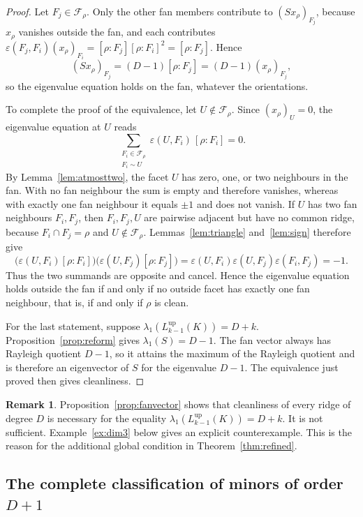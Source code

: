 \documentclass[11pt,reqno]{amsart}
\numberwithin{equation}{section}
\theoremstyle{plain}
\theoremstyle{definition}
\newtheorem{remark}[theorem]{Remark}
\newcommand{\Lup}{L^{\mathrm{up}}}
\newcommand{\eps}{\varepsilon}
\newcommand{\Fset}{\mathcal F}
\begin{document}
\begin{proof}
Let $F_j\in\Fset_\rho$. Only the other fan members contribute to ${(Sx_\rho)}_{F_j}$, because
$x_\rho$ vanishes outside the fan, and each contributes
$\eps(F_j,F_i){(x_\rho)}_{F_i}=[\rho:F_j]{[\rho:F_i]}^{2}=[\rho:F_j]$. Hence
\[
  {(Sx_\rho)}_{F_j}=(D-1)[\rho:F_j]=(D-1){(x_\rho)}_{F_j},
\]
so the eigenvalue equation holds on the fan, whatever the orientations.

To complete the proof of the equivalence, let $U\notin\Fset_\rho$. Since ${(x_\rho)}_U=0$,
the eigenvalue equation at $U$ reads
\[
  \sum_{\substack{F_i\in\Fset_\rho\\ F_i\sim U}}\eps(U,F_i)\,[\rho:F_i]=0 .
\]
By Lemma~\ref{lem:atmosttwo}, the facet $U$ has zero, one, or two neighbours in the fan. With
no fan neighbour the sum is empty and therefore vanishes, whereas with exactly one fan neighbour
it equals $\pm1$ and does not vanish. If $U$ has two fan neighbours $F_i,F_j$, then
$F_i,F_j,U$ are pairwise adjacent but have no common ridge, because $F_i\cap F_j=\rho$ and
$U\notin\Fset_\rho$. Lemmas~\ref{lem:triangle} and~\ref{lem:sign} therefore give
\[
  \bigl(\eps(U,F_i)[\rho:F_i]\bigr)
  \bigl(\eps(U,F_j)[\rho:F_j]\bigr)
  =\eps(U,F_i)\eps(U,F_j)\eps(F_i,F_j)=-1 .
\]
Thus the two summands are opposite and cancel. Hence the eigenvalue equation holds outside the
fan if and only if no outside facet has exactly one fan neighbour, that is, if and only if
$\rho$ is clean.

For the last statement, suppose $\lambda_1(\Lup_{k-1}(K))=D+k$. Proposition~\ref{prop:reform}
gives $\lambda_1(S)=D-1$. The fan vector always has Rayleigh quotient $D-1$, so it attains
the maximum of the Rayleigh quotient and is therefore an eigenvector of $S$ for the eigenvalue
$D-1$. The equivalence just proved then gives cleanliness.
\end{proof}

\begin{remark}\label{rem:whynotsuff}
Proposition~\ref{prop:fanvector} shows that cleanliness of every ridge of degree $D$ is necessary
for the equality $\lambda_1(\Lup_{k-1}(K))=D+k$. It is not sufficient.
Example~\ref{ex:dim3} below gives an explicit counterexample. This is the reason for the
additional global condition in Theorem~\ref{thm:refined}.
\end{remark}

\subsection{The complete classification of minors of order \texorpdfstring{$D+1$}{D+1}}\label{sub:Dplus1}
\end{document}
